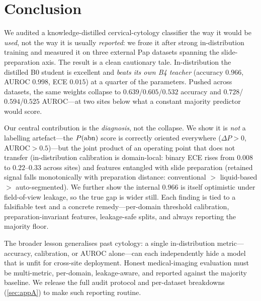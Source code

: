 \section{Conclusion}
\label{sec:conclusion}

We audited a knowledge-distilled cervical-cytology classifier the way it would be \emph{used}, not the
way it is usually \emph{reported}: we froze it after strong in-distribution training and measured it on
three external Pap datasets spanning the slide-preparation axis. The result is a clean cautionary tale.
In-distribution the distilled B0 student is excellent and \emph{beats its own B4 teacher}
(accuracy $0.966$, AUROC $0.998$, ECE $0.015$) at a quarter of the parameters. Pushed across datasets,
the same weights collapse to $0.639$/$0.605$/$0.532$ accuracy and $0.728$/$0.594$/$0.525$ AUROC---at
two sites below what a constant majority predictor would score.

Our central contribution is the \emph{diagnosis}, not the collapse. We show it is \emph{not} a labelling
artefact---the $P(\mathrm{abn})$ score is correctly oriented everywhere ($\Delta P>0$, AUROC$>0.5$)---but the
joint product of an operating point that does not transfer (in-distribution calibration is domain-local:
binary ECE rises from $0.008$ to $0.22$--$0.33$ across sites) and features entangled with slide
preparation (retained signal falls monotonically with preparation
distance: conventional $>$ liquid-based $>$ auto-segmented). We further show the internal $0.966$ is
itself optimistic under field-of-view leakage, so the true gap is wider still. Each finding is tied to a
falsifiable test and a concrete remedy---per-domain threshold calibration, preparation-invariant
features, leakage-safe splits, and always reporting the majority floor.

The broader lesson generalises past cytology: a single in-distribution metric---accuracy, calibration,
or AUROC alone---can each independently hide a model that is unfit for cross-site deployment. Honest
medical-imaging evaluation must be multi-metric, per-domain, leakage-aware, and reported against the
majority baseline. We release the full audit protocol and per-dataset breakdowns
(\cref{sec:appA}) to make such reporting routine.
